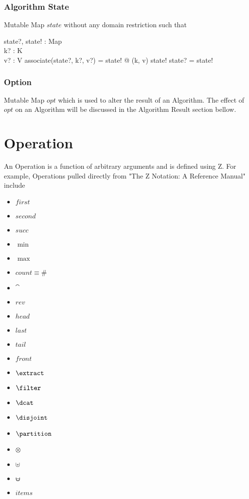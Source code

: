 \documentclass[../main.tex]{subfiles}
\begin{document}
\subsubsection{Algorithm State}

Mutable Map $state$ without any domain restriction such that
\begin{axdef}
  state?, state! : Map \\
  k? : K \\
  v? : V
  \where
  associate(state?, k?, v?) = state! @ (k, v) \in state! \implies state? \not= state!
\end{axdef}

\subsubsection{Option}

Mutable Map $opt$ which is used to alter the result of an Algorithm. The effect of $opt$ on an Algorithm will be discussed in the Algorithm Result section bellow.

\section{Operation}

An Operation is a function of arbitrary arguments and is defined using Z. For example, Operations pulled directly from "The Z Notation: A Reference Manual" include
\begin{itemize}
\item $first$
\item $second$
\item $succ$
\item $\min$
\item $\max$
\item $count \equiv \#$
\item $\cat$
\item $rev$
\item $head$
\item $last$
\item $tail$
\item $front$
\item $\extract$
\item $\filter$
\item $\dcat$
\item $\disjoint$
\item $\partition$
\item $\otimes$
\item $\uplus$
\item $\uminus$
\item $items$
\end{itemize}
\end{document}
